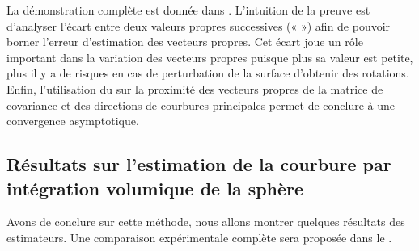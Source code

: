 La démonstration complète est donnée dans \cite{ChapterIICurvature}. L'intuition
de la preuve est d'analyser l'écart entre deux valeurs propres successives («
 ») afin de pouvoir borner l'erreur d'estimation
des vecteurs propres. Cet écart joue un rôle important dans la variation des
vecteurs propres puisque plus sa valeur est petite, plus il y a de risques en
cas de perturbation de la surface d'obtenir des rotations. Enfin, l'utilisation
du  sur la proximité des vecteurs propres de la
matrice de covariance et des directions de courbures principales permet de
conclure à une convergence asymptotique.
%
\subsection{Résultats sur l'estimation de la courbure par intégration volumique de la sphère}
%
Avons de conclure sur cette méthode, nous allons montrer quelques résultats des
estimateurs. Une comparaison expérimentale complète sera proposée dans le
.


